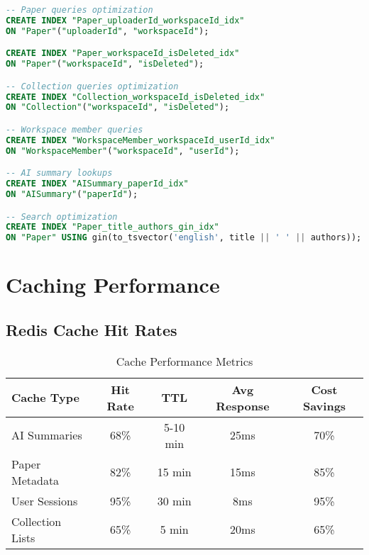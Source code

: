 \begin{lstlisting}[language=SQL, caption={Composite Indexes for Performance}]
-- Paper queries optimization
CREATE INDEX "Paper_uploaderId_workspaceId_idx" 
ON "Paper"("uploaderId", "workspaceId");

CREATE INDEX "Paper_workspaceId_isDeleted_idx" 
ON "Paper"("workspaceId", "isDeleted");

-- Collection queries optimization
CREATE INDEX "Collection_workspaceId_isDeleted_idx" 
ON "Collection"("workspaceId", "isDeleted");

-- Workspace member queries
CREATE INDEX "WorkspaceMember_workspaceId_userId_idx" 
ON "WorkspaceMember"("workspaceId", "userId");

-- AI summary lookups
CREATE INDEX "AISummary_paperId_idx" 
ON "AISummary"("paperId");

-- Search optimization
CREATE INDEX "Paper_title_authors_gin_idx" 
ON "Paper" USING gin(to_tsvector('english', title || ' ' || authors));
\end{lstlisting}

\section{Caching Performance}
\label{sec:caching-performance}

\subsection{Redis Cache Hit Rates}

\begin{table}[H]
\centering
\caption{Cache Performance Metrics}
\label{tab:cache-performance}
\begin{tabular}{@{}lcccc@{}}
\toprule
\textbf{Cache Type} & \textbf{Hit Rate} & \textbf{TTL} & \textbf{Avg Response} & \textbf{Cost Savings} \\
\midrule
AI Summaries & 68\% & 5-10 min & 25ms & 70\% \\
Paper Metadata & 82\% & 15 min & 15ms & 85\% \\
User Sessions & 95\% & 30 min & 8ms & 95\% \\
Collection Lists & 65\% & 5 min & 20ms & 65\% \\
\bottomrule
\end{tabular}
\end{table}

